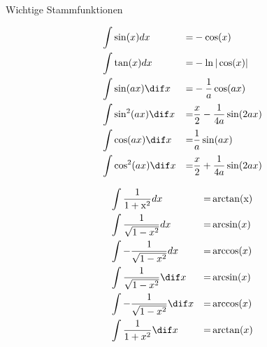 \begin{highlight}{Wichtige Stammfunktionen}
\begin{center}
\begin{minipage}{0.4\linewidth}
\begin{align*}
                    &\int\sin (x) d x  &=& -\cos (x) \\
                    &\int\tan (x) d x  &=& -\ln |\cos (x)| \\
                    &\int \sin(ax)\dif x  &=&  - \frac{1}{a} \cos(a x)  \\
                    &\int \sin^2(ax)\dif x  &=&  \frac{x}{2} - \frac{1}{4a} \sin(2 a x)  \\
        			&\int \cos(ax)\dif x  &=&  \frac{1}{a} \sin(a x)  \\
        			&\int \cos^2(ax)\dif x  &=&  \frac{x}{2} + \frac{1}{4a} \sin(2 a x)  \\
                \end{align*}
        \end{minipage}
        \hfill\vline\hfill
        \begin{minipage}{0.45\linewidth}
            \begin{align*}
                    &\int\frac{1}{1+\mathrm{x}^{2}} d x  &=& \arctan (\mathrm{x})\\
                    &\int\frac{1}{\sqrt{1-x^{2}}} d x  &=& \arcsin (x) \\
                    &\int -\frac{1}{\sqrt{1-x^{2}}} d x  &=& \arccos (x) \\
        			&\int \frac{1}{\sqrt{1-x^2}}\dif x  &=&  \arcsin(x)  \\
        			&\int -\frac{1}{\sqrt{1-x^2}}\dif x  &=&  \arccos(x)  \\
        			&\int \frac{1}{1+x^2}\dif x  &=&  \arctan(x)  \\
            \end{align*}
        \end{minipage}
    \end{center}
\end{highlight}


